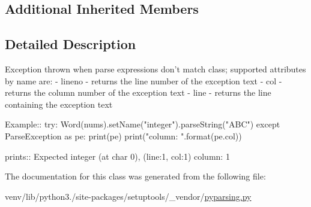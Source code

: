 \subsection*{Additional Inherited Members}


\subsection{Detailed Description}
\begin{DoxyVerb}Exception thrown when parse expressions don't match class;
supported attributes by name are:
 - lineno - returns the line number of the exception text
 - col - returns the column number of the exception text
 - line - returns the line containing the exception text
    
Example::
    try:
        Word(nums).setName("integer").parseString("ABC")
    except ParseException as pe:
        print(pe)
        print("column: {}".format(pe.col))
        
prints::
   Expected integer (at char 0), (line:1, col:1)
    column: 1
\end{DoxyVerb}
 

The documentation for this class was generated from the following file\+:\begin{DoxyCompactItemize}
\item 
venv/lib/python3./site-\/packages/setuptools/\+\_\+vendor/\hyperlink{setuptools_2__vendor_2pyparsing_8py}{pyparsing.\+py}\end{DoxyCompactItemize}
